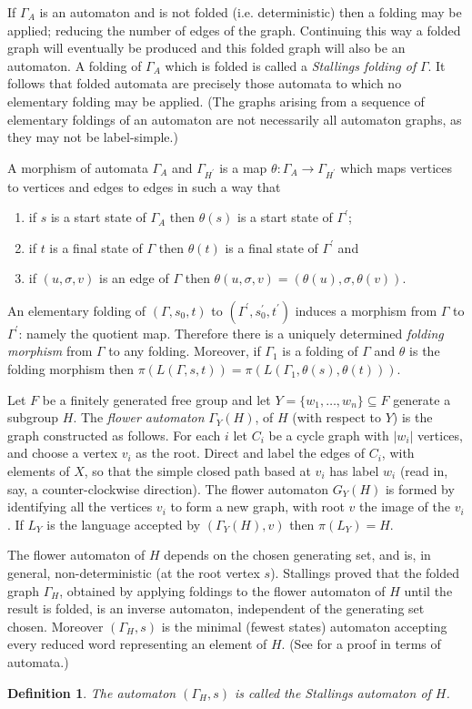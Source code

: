\documentclass[a4paper,12pt]{article}
\newcommand{\G}{\Gamma }
\newtheorem{definition}[theorem]{Definition}
\numberwithin{equation}{section}
\numberwithin{figure}{section}
\newcommand{\maps}{\rightarrow}
\newcommand{\be}{\begin{enumerate}}
\newcommand{\ee}{\end{enumerate}}
\begin{document}
If $\G_A$ is an automaton and  is not folded (i.e. deterministic) 
then a folding may be applied; reducing the
number of edges of the graph. Continuing this way a folded graph will eventually
be produced and this folded graph will also be an automaton. 
A folding of $\G_A$ which is folded is called a \emph{Stallings folding of}
$\G$.
It follows that  folded  automata are precisely those
automata to which no elementary folding may be applied. (The graphs arising
from a sequence of elementary foldings of an automaton are not necessarily
all automaton graphs, as they may not 
be label-simple.)  

A morphism of automata $\G_A$ and $\G_{H^\prime}$ is a map
$\theta: \G_A\maps \G_{H^\prime}$ which maps vertices to vertices and
edges to edges in such a way that
\be \item if $s$ is a start state  of
$\G_A$ then $\theta(s)$ is a start state of $\G^\prime$;
\item if $t$ is a final state of $\G$ then $\theta(t)$ is a final state of
$\G^\prime$ and
\item  if
$(u,\sigma,v)$ is an edge of $\G$ then
$\theta(u,\sigma,v)=(\theta(u),\sigma,\theta(v))$. \ee An
elementary folding of  $(\G,s_0,t)$ to $(\G^\prime,s^\prime_0,
t^\prime)$ induces a morphism from $\G$ to $\G^\prime$: namely the
quotient map. Therefore there is
 a uniquely determined {\em folding morphism}  from $\G$ to any folding. Moreover, if $\G_1$
is a folding of $\G$ and $\theta$ is the folding morphism then
$\pi(L(\G,s,t))= \pi(L(\G_1,\theta(s),\theta(t)))$.




Let $F$ be a finitely generated free group and let 
$Y=\{w_1,\ldots ,w_n\}\subseteq F$ generate a subgroup $H$. 
The {\em flower automaton} $\G_Y(H)$, of $H$ (with respect to $Y$)
is the graph constructed as follows. For each $i$ let $C_i$ be a cycle
graph with $|w_i|$ vertices, and choose a vertex $v_i$ as the root. Direct
and label the edges of $C_i$, with elements of $X$,
so that the simple closed path based at $v_i$ has
label $w_i$ (read in, say, a counter-clockwise direction). The flower
automaton $G_Y(H)$ is formed by identifying all the vertices $v_i$ to form
a new graph, with root $v$ the image of the $v_i$. If $L_Y$ is the language  accepted
by $(\G_Y(H), v)$ then $\pi(L_Y)=H$.


The flower automaton of $H$ depends on the chosen generating set, and is,
in general,
non-deterministic (at the root vertex $s$). Stallings \cite{stallings83}
proved that the folded graph $\G_H$, obtained by applying foldings to the
flower automaton of $H$ until the result is folded, is an inverse
automaton, independent of the generating set chosen.
Moreover  $(\G_H,s)$ is the minimal (fewest states) automaton accepting
every reduced word representing an element of $H$. (See \cite{BartholdiSilva}
for a proof in terms of automata.)
\begin{definition}
The automaton $(\G_H,s)$ is  called the {\em Stallings automaton} of $H$.
\end{definition}
\end{document}
